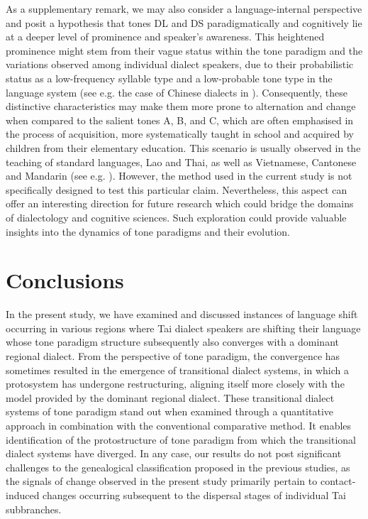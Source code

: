 \documentclass[output=paper]{langscibook}
\begin{document}
As a supplementary remark, we may also consider a language-internal perspective and posit a hypothesis that tones DL and DS paradigmatically and cognitively lie at a deeper level of prominence and speaker’s awareness. This heightened prominence might stem from their vague status within the tone paradigm and the variations observed among individual dialect speakers, due to their probabilistic status as a low-frequency syllable type and a low-probable tone type in the language system (see e.g. the case of Chinese dialects in \citealt{WienerIto2015}). Consequently, these distinctive characteristics may make them more prone to alternation and change when compared to the salient tones A, B, and C, which are often emphasised in the process of acquisition, more systematically taught in school and acquired by children from their elementary education. This scenario is usually observed in the teaching of standard languages, Lao and Thai, as well as Vietnamese, Cantonese and Mandarin (see e.g. \citealt{Bar-Lev1991}). However, the method used in the current study is not specifically designed to test this particular claim. Nevertheless, this aspect can offer an interesting direction for future research which could bridge the domains of dialectology and cognitive sciences. Such exploration could provide valuable insights into the dynamics of tone paradigms and their evolution.

\section{Conclusions}
\label{sec:yurayong:5}
In the present study, we have examined and discussed instances of language shift occurring in various regions where Tai dialect speakers are shifting their language whose tone paradigm structure subsequently also converges with a dominant regional dialect. From the perspective of tone paradigm, the convergence has sometimes resulted in the emergence of transitional dialect systems, in which a protosystem has undergone restructuring, aligning itself more closely with the model provided by the dominant regional dialect. These transitional dialect systems of tone paradigm stand out when examined through a quantitative approach in combination with the conventional comparative method. It enables identification of the protostructure of tone paradigm from which the transitional dialect systems have diverged. In any case, our results do not post significant challenges to the genealogical classification proposed in the previous studies, as the signals of change observed in the present study primarily pertain to contact-induced changes occurring subsequent to the dispersal stages of individual Tai subbranches.
\end{document}
